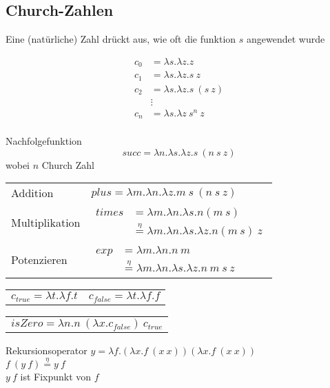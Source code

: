 \documentclass{Zusammenfassung}
\begin{document}
\subsection{Church-Zahlen}\label{subsec:church-zahlen}
Eine (natürliche) Zahl drückt aus, wie oft die funktion $s$ angewendet wurde\\
    \begin{multicols}{2}
        \begin{equation*}
            \begin{aligned}
                c_0 &= \lambda s.\lambda z.z\\
                c_1 &= \lambda s.\lambda z.s\ z\\
                c_2 &= \lambda s. \lambda z.s\ (s\ z)\\
                &\vdots\\
                c_n &= \lambda s. \lambda z\ s^n\ z
        \end{aligned}\label{eq:equation}
        \end{equation*}
        \columnbreak\\
        Nachfolgefunktion \[succ = \lambda n.\lambda s.\lambda z.s\ (n\ s\ z)\]
        wobei $n$ Church Zahl
    \end{multicols}
\begin{table}[H]
    \centering
    \begin{tabularx}{\textwidth}{lX}
        Addition & $plus = \lambda m.\lambda n.\lambda z.m\ s\ (n\ s\ z)$\\
        Multiplikation & $\begin{aligned} times &= \lambda m.\lambda n.\lambda s.n(m\ s)\\&\stackrel{\eta}{=} \lambda m.\lambda n.\lambda s.\lambda z.n(m\ s)\ z\end{aligned}$\\
        Potenzieren & $\begin{aligned} exp &= \lambda m.\lambda n.n\ m\\&\stackrel{\eta}{=}\lambda m.\lambda n.\lambda s.\lambda z.n\ m\ s\ z\end{aligned}$\\
    \end{tabularx}\label{tab:table2}
    \begin{tabularx}{\textwidth}{ll}
        $c_{true}= \lambda t.\lambda f.t$ & $c_{false} = \lambda t.\lambda f.f$\\
    \end{tabularx}
    \begin{tabularx}{\textwidth}{l}
    $isZero = \lambda n.n\ (\lambda x.c_{false})\ c_{true}$
    \end{tabularx}
\end{table}
    Rekursionsoperator
    $y =\lambda f.(\lambda x.f\ (x\ x))(\lambda x.f\ (x\ x))$\\
    $f\ (y\ f)\stackrel{\eta}{=}y\ f$\\
    $y\ f$ ist Fixpunkt von $f$\\
\end{document}
